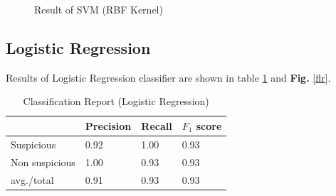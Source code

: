 \begin{figure}[H]
\centering
{}%
\hfill %
%
\caption{Result of SVM (RBF Kernel)}
\label{svr}
\end{figure}

\subsection{\textbf{Logistic Regression}}
Results of Logistic Regression classifier are shown in table \ref{lr} and \textbf{Fig.} \ref{flr}.

\begin{table}[h!]
\begin{center}
\caption{Classification Report (Logistic Regression)}
\begin{tabular}{|m{2.8cm} | m{1.5cm}| m{1.3cm}| m{1.5cm}|}
\hline
     & Precision & Recall & $F_1$ score\\
\hline
     Suspicious & 0.92 & 1.00 & 0.93\\
\hline 
     Non suspicious  & 1.00 & 0.93 & 0.93\\
\hline 
     avg./total & 0.91 & 0.93 & 0.93\\
\hline
\end{tabular}
\label{lr}
\end{center}
\end{table}

